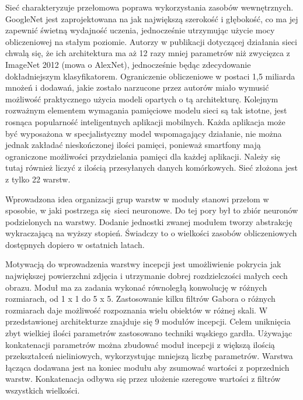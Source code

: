 \documentclass[12pt,a4paper,twoside,titlepage,openright]{book}
\begin{document}
\begin{itemize}
\begin{itemize}
Sieć charakteryzuje przełomowa poprawa wykorzystania zasobów wewnętrznych. GoogleNet jest zaprojektowana na jak największą szerokość i głębokość, co ma jej zapewnić świetną wydajność uczenia, jednocześnie utrzymując użycie mocy obliczeniowej na stałym poziomie. Autorzy w publikacji dotyczącej działania sieci chwalą się, że ich architektura ma aż 12 razy mniej parametrów niż zwycięzca z ImageNet 2012 (mowa o AlexNet), jednocześnie będąc zdecydowanie dokładniejszym klasyfikatorem. Ograniczenie obliczeniowe w postaci 1,5 miliarda mnożeń i dodawań, jakie zostało narzucone przez autorów miało wymusić możliwość praktycznego użycia modeli opartych o tą architekturę. Kolejnym rozważnym elementem wymagania pamięciowe modelu sieci są tak istotne, jest rosnąca popularność inteligentnych aplikacji mobilnych. Każda aplikacja może być wyposażona w specjalistyczny model wspomagający działanie, nie można jednak zakładać nieskończonej ilości pamięci, ponieważ smartfony mają ograniczone możliwości przydzielania pamięci dla każdej aplikacji. Należy się tutaj również liczyć z ilością przesyłanych danych komórkowych. Sieć złożona jest z tylko 22 warstw.

Wprowadzona idea organizacji grup warstw w moduły stanowi przełom w sposobie, w jaki postrzega się sieci neuronowe. Do tej pory był to zbiór neuronów podzielonych na warstwy. Dodanie jednostki zwanej modułem tworzy abstrakcję wykraczającą na wyższy stopień. Świadczy to o wielkości zasobów obliczeniowych dostępnych dopiero w ostatnich latach. \cite{DBLP:journals/corr/SzegedyLJSRAEVR14}

Motywacją do wprowadzenia warstwy incepcji jest umożliwienie pokrycia jak największej powierzchni zdjęcia i utrzymanie dobrej rozdzielczości małych cech obrazu. Moduł ma za zadania wykonać równoległą konwolucję w różnych rozmiarach, od 1 x 1 do 5 x 5. Zastosowanie kilku filtrów Gabora o różnych rozmiarach daje możliwość rozpoznania wielu obiektów w różnej skali. W przedstawionej architekturze znajduje się 9 modułów incepcji. Celem uniknięcia zbyt wielkiej ilości parametrów zastosowano techniki wąskiego gardła. Używając konkatenacji parametrów można zbudować moduł incepcji z większą ilością przekształceń nieliniowych, wykorzystując mniejszą liczbę parametrów. Warstwa łącząca dodawana jest na koniec modułu aby zsumować wartości z poprzednich warstw. Konkatenacja odbywa się przez ułożenie szeregowe wartości z filtrów wszystkich wielkości.


\end{itemize}
\end{itemize}
\end{document}

